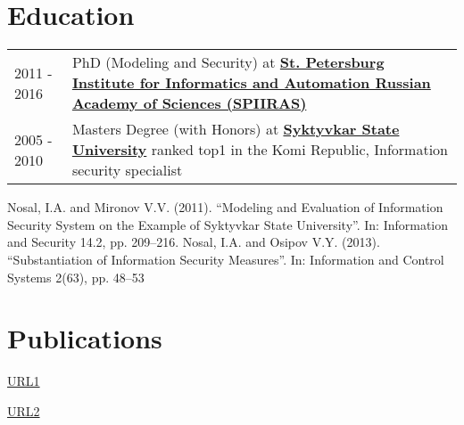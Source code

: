 \documentclass[a4paper,12pt]{article}
\begin{document}
\section{Education}
\begin{tabularx}{\linewidth}{@{}l X@{}}
2011 - 2016 & PhD (Modeling and Security) at \textbf{\href{http://www.spiiras.nw.ru/en/}{St. Petersburg Institute for Informatics and Automation Russian Academy of Sciences (SPIIRAS)}} \\

2005 - 2010 & Masters Degree (with Honors) at \textbf{\href{https://en.syktsu.ru/}{Syktyvkar State University}} ranked top1 in the Komi Republic, Information security specialist \hfill  \\
\end{tabularx}

Nosal, I.A. and Mironov V.V. (2011). “Modeling and Evaluation of Information Security System on the
Example of Syktyvkar State University”. In: Information and Security 14.2, pp. 209–216.
Nosal, I.A. and Osipov V.Y. (2013). “Substantiation of Information Security Measures”. In: Information
and Control Systems 2(63), pp. 48–53


\section{Publications}

\begin{refsection}
\nocite{nosal2011modeling}
\printbibliography[heading=none]
\end{refsection}
\href{https://scholar.google.com/citations?view_op=view_citation&hl=ru&user=g1m_ATEAAAAJ&citation_for_view=g1m_ATEAAAAJ:d1gkVwhDpl0C}{URL1}

\begin{refsection}
\nocite{nosal2013substantiation}
\printbibliography[heading=none]
\end{refsection}

\href{https://www.researchgate.net/publication/260185876_Substantiation_of_Information_Security_Measure}{URL2}


\end{document}
